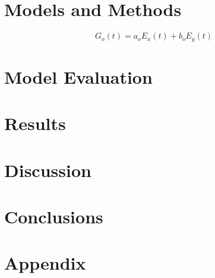 \documentclass[draft,linenumbers]{agujournal2018}
\begin{document}
\section{Models and Methods}
\label{section:Models_and_Methods}

\begin{linenomath*}
  \begin{equation}
    G_o(t) = a_oE_x(t) + b_oE_y(t)
    \label{model1}
  \end{equation}
\end{linenomath*}

\noindent

\section{Model Evaluation}
\label{section:Model_Evaluation}

\section{Results}
\label{Results}

\section{Discussion}
\label{Discussion}

\section{Conclusions}

\clearpage

\section{Appendix}
\end{document}
